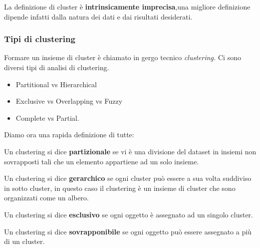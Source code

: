 La definizione di cluster è \textbf{intrinsicamente imprecisa},una migliore definizione dipende infatti dalla natura dei dati e dai risultati desiderati. 

\subsubsection{Tipi di clustering}

Formare un insieme di cluster è chiamato in gergo tecnico \textit{clustering.} Ci sono diversi tipi di analisi di clustering.

\begin{itemize}
	\item Partitional vs Hierarchical
	\item Exclusive vs  Overlapping vs Fuzzy
	\item Complete vs Partial.
\end{itemize}

Diamo ora una rapida definizione di tutte:

\begin{defn}
	Un clustering si dice \textbf{partizionale} se vi è una divisione del dataset in insiemi non sovrapposti tali che un elemento appartiene ad un solo insieme.
\end{defn}

\begin{defn}
	Un clustering si dice \textbf{gerarchico} se ogni cluster può essere a sua volta suddiviso in sotto cluster, in questo caso il clustering è un insieme di cluster che sono organizzati come un albero.
\end{defn}

\begin{defn}
	Un clustering si dice \textbf{esclusivo} se ogni oggetto è assegnato ad un singolo cluster.
\end{defn}

\begin{defn}
	Un clustering si dice \textbf{sovrapponibile} se ogni oggetto può essere assegnato a più di un cluster.
\end{defn}

